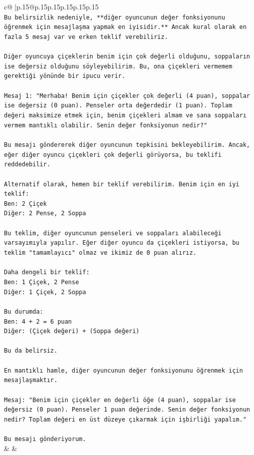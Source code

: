 \documentclass{article}
\begin{document}
{\begin{supertabular}{c@{$\;$}|p{.15\linewidth}@{}p{.15\linewidth}p{.15\linewidth}p{.15\linewidth}p{.15\linewidth}p{.15\linewidth}}
{{{\\ 
\texttt{Bu belirsizlik nedeniyle, **diğer oyuncunun değer fonksiyonunu öğrenmek için mesajlaşma yapmak en iyisidir.** Ancak kural olarak en fazla 5 mesaj var ve erken teklif verebiliriz.} \\
\\ 
\texttt{Diğer oyuncuya çiçeklerin benim için çok değerli olduğunu, soppaların ise değersiz olduğunu söyleyebilirim. Bu, ona çiçekleri vermemem gerektiği yönünde bir ipucu verir.} \\
\\ 
\texttt{Mesaj 1: "Merhaba! Benim için çiçekler çok değerli (4 puan), soppalar ise değersiz (0 puan). Penseler orta değerdedir (1 puan). Toplam değeri maksimize etmek için, benim çiçekleri almam ve sana soppaları vermem mantıklı olabilir. Senin değer fonksiyonun nedir?"} \\
\\ 
\texttt{Bu mesajı göndererek diğer oyuncunun tepkisini bekleyebilirim. Ancak, eğer diğer oyuncu çiçekleri çok değerli görüyorsa, bu teklifi reddedebilir.} \\
\\ 
\texttt{Alternatif olarak, hemen bir teklif verebilirim. Benim için en iyi teklif:} \\
\texttt{Ben: 2 Çiçek} \\
\texttt{Diğer: 2 Pense, 2 Soppa} \\
\\ 
\texttt{Bu teklim, diğer oyuncunun penseleri ve soppaları alabileceği varsayımıyla yapılır. Eğer diğer oyuncu da çiçekleri istiyorsa, bu teklim "tamamlayıcı" olmaz ve ikimiz de 0 puan alırız.} \\
\\ 
\texttt{Daha dengeli bir teklif:} \\
\texttt{Ben: 1 Çiçek, 2 Pense} \\
\texttt{Diğer: 1 Çiçek, 2 Soppa} \\
\\ 
\texttt{Bu durumda:} \\
\texttt{Ben: 4 + 2 = 6 puan} \\
\texttt{Diğer: (Çiçek değeri) + (Soppa değeri)} \\
\\ 
\texttt{Bu da belirsiz.} \\
\\ 
\texttt{En mantıklı hamle, diğer oyuncunun değer fonksiyonunu öğrenmek için mesajlaşmaktır.} \\
\\ 
\texttt{Mesaj: "Benim için çiçekler en değerli öğe (4 puan), soppalar ise değersiz (0 puan). Penseler 1 puan değerinde. Senin değer fonksiyonun nedir? Toplam değeri en üst düzeye çıkarmak için işbirliği yapalım."} \\
\\ 
\texttt{Bu mesajı gönderiyorum.} \\
            }
        }
    }
    & & \\ \\


\end{supertabular}}
\end{document}
